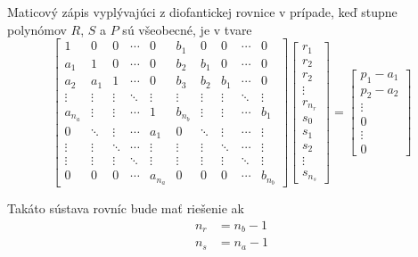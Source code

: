 \documentclass[a4paper, 10pt, ]{article}
\begin{document}
Maticový zápis vyplývajúci z diofantickej rovnice v prípade, keď stupne polynómov $R$, $S$ a $P$ sú všeobecné, je v tvare
\begin{equation} \label{VelkaDiofanRov}
	\begin{bmatrix}
		   1 &      0 &      0 & \cdots &       0 &     b_1 &      0 &      0 & \cdots &       0 \\
	 	 a_1 &      1 &      0 & \cdots &       0 &     b_2 &    b_1 &      0 & \cdots &       0 \\
	 	 a_2 &    a_1 &      1 & \cdots &       0 &     b_3 &    b_2 &    b_1 & \cdots &       0 \\
      \vdots & \vdots & \vdots & \ddots &  \vdots &  \vdots & \vdots & \vdots & \ddots &  \vdots \\
     a_{n_a} & \vdots & \vdots & \cdots &       1 & b_{n_b} & \vdots & \vdots & \cdots &     b_1 \\
           0 & \ddots & \vdots & \cdots &     a_1 &       0 & \ddots & \vdots & \cdots &  \vdots \\
      \vdots & \vdots & \ddots & \cdots &  \vdots &  \vdots & \vdots & \ddots & \cdots &  \vdots \\
      \vdots & \vdots & \vdots & \ddots &  \vdots &  \vdots & \vdots & \vdots & \ddots &  \vdots \\
           0 &      0 &      0 & \cdots & a_{n_a} &       0 &      0 &      0 & \cdots & b_{n_b}
	\end{bmatrix}
	\begin{bmatrix} r_1 \\ r_2 \\ r_2 \\ \vdots \\ r_{n_r} \\ s_0 \\ s_1 \\ s_2 \\ \vdots \\ s_{n_s} \end{bmatrix}
	=
	\begin{bmatrix} p_1 - a_1 \\ p_2 - a_2 \\ \vdots \\ 0 \\ \vdots \\ 0 \end{bmatrix}
\end{equation}


Takáto sústava rovníc bude mať riešenie ak
\begin{subequations}
	\begin{align}
		 n_r &= n_b - 1 \\
		 n_s &= n_a - 1
	\end{align}
\end{subequations}
\end{document}

